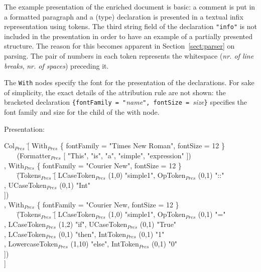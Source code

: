  The example presentation of the enriched document is basic: a comment is put in a formatted paragraph and a (type) declaration is presented in a textual infix representation using tokens. The third string field of the declaration \verb|"info"| is not included in the presentation in order to have an example of a partially presented structure. The reason for this becomes apparent in Section~\ref{sect:parser} on parsing. The pair of numbers in each token represents the whitespace ({\em nr. of line breaks}, {\em nr. of spaces}) preceding it. 

The \verb|With| nodes specify the font for the presentation of the declarations. For sake of simplicity, the exact details of the attribution rule are not shown: the bracketed declaration \verb|{fontFamily = "|{\em name}\verb|", fontSize = |{\em size}\verb|}| specifies the font family and size for the child of the with node.  

Presentation:
\small \ttfamily
\begin{tabbing}
Col$_{Pres}$ \= [ With$_{Pres}$ \{ fontFamily = "Times New Roman", fontSize = 12 \}\\
       \>  ~~~ (Formatter$_{Pres}$ [ "This", "is", "a", "simple", "expression" ])\\
       \>, With$_{Pres}$ \{ fontFamily = "Courier New", fontSize = 12 \}\\
       \>  ~~~ \= (Tokens$_{Pres}$ \= [ LCaseToken$_{Pres}$ (1,0) "simple1",  OpToken$_{Pres}$ (0,1) "::"\\  
       \>          \>              \> , UCaseToken$_{Pres}$ (0,1) "Int"\\
       \>          \>              \> ])\\
       \>, With$_{Pres}$ \{ fontFamily = "Courier New,  fontSize = 12 \}\\
       \>  ~~~ \= (Tokens$_{Pres}$ \= [ LCaseToken$_{Pres}$ (1,0) "simple1", OpToken$_{Pres}$ (0,1) "="\\
       \>          \>              \> , LCaseToken$_{Pres}$ (1,2) "if", UCaseToken$_{Pres}$ (0,1) "True"\\
       \>          \>              \> , LCaseToken$_{Pres}$ (0,1) "then", IntToken$_{Pres}$ (0,1) "1"\\
       \>          \>              \> , LowercaseToken$_{Pres}$ (1,10) "else", IntToken$_{Pres}$ (0,1) "0"\\
       \>          \>              \> ])\\
             \> ]
\end{tabbing}
\rmfamily \normalsize


